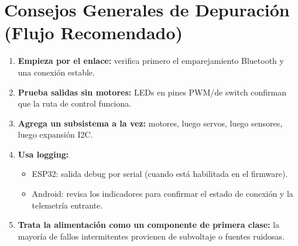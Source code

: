 \section{Consejos Generales de Depuración (Flujo Recomendado)}
\label{sec:debugging-tips}

\begin{enumerate}
    \item \textbf{Empieza por el enlace:} verifica primero el emparejamiento Bluetooth y una conexión estable.
    \item \textbf{Prueba salidas sin motores:} LEDs en pines PWM/de switch confirman que la ruta de control funciona.
    \item \textbf{Agrega un subsistema a la vez:} motores, luego servos, luego sensores, luego expansión I2C.
    \item \textbf{Usa logging:}
    \begin{itemize}
        \item ESP32: salida debug por serial (cuando está habilitada en el firmware).
        \item Android: revisa los indicadores para confirmar el estado de conexión y la telemetría entrante.
    \end{itemize}
    \item \textbf{Trata la alimentación como un componente de primera clase:} la mayoría de fallos intermitentes provienen de subvoltaje o fuentes ruidosas.
\end{enumerate}